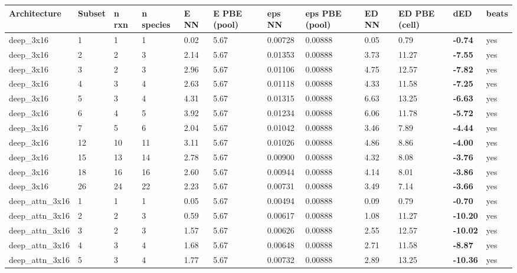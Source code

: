 \documentclass[10pt,a4paper]{article}
\begin{document}
\begin{landscape}
\begin{footnotesize}
\begin{longtable}{llllllllllll}
\toprule Architecture & Subset & n rxn & n species & E NN & E PBE (pool) & eps NN & eps PBE (pool) & ED NN & ED PBE (cell) & dED & beats \\ \midrule \endhead
deep\_3x16 & 1 & 1 & 1 & 0.02 & 5.67 & 0.00728 & 0.00888 & 0.05 & 0.79 & \textbf{-0.74} & yes \\
deep\_3x16 & 2 & 2 & 3 & 2.14 & 5.67 & 0.01353 & 0.00888 & 3.73 & 11.27 & \textbf{-7.55} & yes \\
deep\_3x16 & 3 & 2 & 3 & 2.96 & 5.67 & 0.01106 & 0.00888 & 4.75 & 12.57 & \textbf{-7.82} & yes \\
deep\_3x16 & 4 & 3 & 4 & 2.63 & 5.67 & 0.01118 & 0.00888 & 4.33 & 11.58 & \textbf{-7.25} & yes \\
deep\_3x16 & 5 & 3 & 4 & 4.31 & 5.67 & 0.01315 & 0.00888 & 6.63 & 13.25 & \textbf{-6.63} & yes \\
deep\_3x16 & 6 & 4 & 5 & 3.92 & 5.67 & 0.01234 & 0.00888 & 6.06 & 11.78 & \textbf{-5.72} & yes \\
deep\_3x16 & 7 & 5 & 6 & 2.04 & 5.67 & 0.01042 & 0.00888 & 3.46 & 7.89 & \textbf{-4.44} & yes \\
deep\_3x16 & 12 & 10 & 11 & 3.11 & 5.67 & 0.01026 & 0.00888 & 4.86 & 8.86 & \textbf{-4.00} & yes \\
deep\_3x16 & 15 & 13 & 14 & 2.78 & 5.67 & 0.00900 & 0.00888 & 4.32 & 8.08 & \textbf{-3.76} & yes \\
deep\_3x16 & 18 & 16 & 16 & 2.60 & 5.67 & 0.00944 & 0.00888 & 4.14 & 8.01 & \textbf{-3.86} & yes \\
deep\_3x16 & 26 & 24 & 22 & 2.23 & 5.67 & 0.00731 & 0.00888 & 3.49 & 7.14 & \textbf{-3.66} & yes \\
deep\_attn\_3x16 & 1 & 1 & 1 & 0.05 & 5.67 & 0.00494 & 0.00888 & 0.09 & 0.79 & \textbf{-0.70} & yes \\
deep\_attn\_3x16 & 2 & 2 & 3 & 0.59 & 5.67 & 0.00617 & 0.00888 & 1.08 & 11.27 & \textbf{-10.20} & yes \\
deep\_attn\_3x16 & 3 & 2 & 3 & 1.57 & 5.67 & 0.00626 & 0.00888 & 2.55 & 12.57 & \textbf{-10.02} & yes \\
deep\_attn\_3x16 & 4 & 3 & 4 & 1.68 & 5.67 & 0.00648 & 0.00888 & 2.71 & 11.58 & \textbf{-8.87} & yes \\
deep\_attn\_3x16 & 5 & 3 & 4 & 1.77 & 5.67 & 0.00732 & 0.00888 & 2.89 & 13.25 & \textbf{-10.36} & yes \\

\end{longtable}
\end{footnotesize}
\end{landscape}
\end{document}
